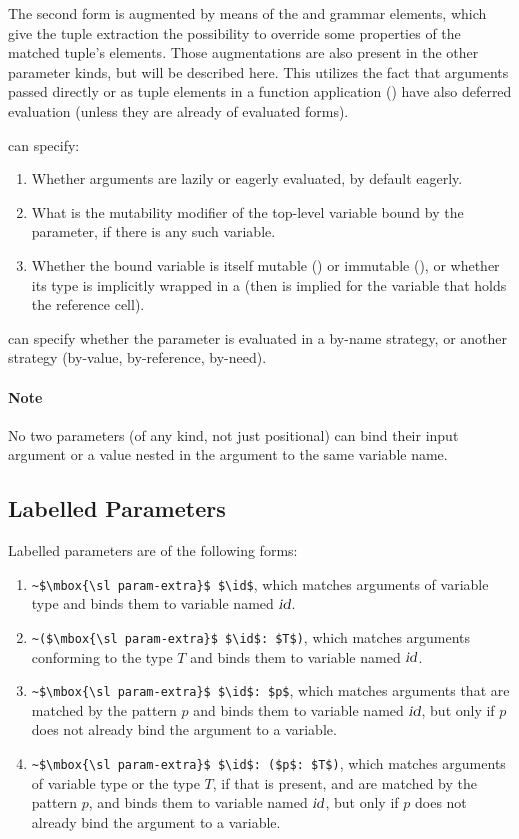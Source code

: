 The second form is augmented by means of the  and  grammar elements, which give the tuple extraction the possibility to override some properties of the matched tuple's elements. Those augmentations are also present in the other parameter kinds, but will be described here. This utilizes the fact that arguments passed directly or as tuple elements in a function application () have also deferred evaluation (unless they are already of evaluated forms). 

 can specify:
\begin{enumerate}
  \item Whether arguments are lazily or eagerly evaluated, by default eagerly. 
  \item What is the mutability modifier of the top-level variable bound by the parameter, if there is any such variable. 
  \item Whether the bound variable is itself mutable () or immutable (), or whether its type is implicitly wrapped in a  (then  is implied for the variable that holds the reference cell). 
\end{enumerate}

 can specify whether the parameter is evaluated in a by-name strategy, or another strategy (by-value, by-reference, by-need). 

\paragraph{Note}
No two parameters (of any kind, not just positional) can bind their input argument or a value nested in the argument to the same variable name. 





\subsection{Labelled Parameters}
\label{sec:labelled-parameters}

Labelled parameters are of the following forms:
\begin{enumerate}
  \item \lstinline!~$\mbox{\sl param-extra}$ $\id$!, which matches arguments of variable type and binds them to variable named $\mbox{\sl id}$. 
  \item \lstinline!~($\mbox{\sl param-extra}$ $\id$: $T$)!, which matches arguments conforming to the type $T$ and binds them to variable named $\mbox{\sl id}$. 
  \item \lstinline!~$\mbox{\sl param-extra}$ $\id$: $p$!, which matches arguments that are matched by the pattern $p$ and binds them to variable named $\mbox{\sl id}$, but only if $p$ does not already bind the argument to a variable. 
  \item \lstinline!~$\mbox{\sl param-extra}$ $\id$: ($p$: $T$)!, which matches arguments of variable type or the type $T$, if that is present, and are matched by the pattern $p$, and binds them to variable named $\mbox{\sl id}$, but only if $p$ does not already bind the argument to a variable. 
\end{enumerate}

